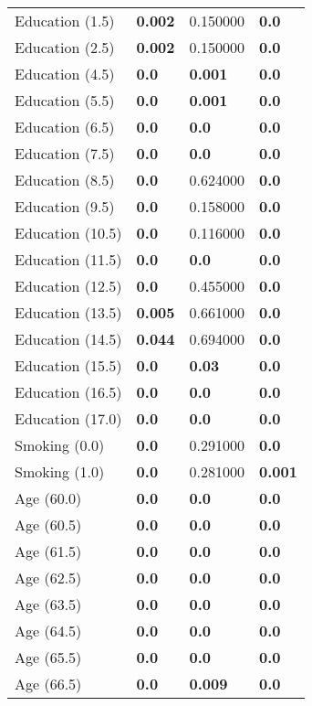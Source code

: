 \begin{tabular}{llll}
Education (1.5) & \textbf{0.002} & 0.150000 & \textbf{0.0} \\
Education (2.5) & \textbf{0.002} & 0.150000 & \textbf{0.0} \\
Education (4.5) & \textbf{0.0} & \textbf{0.001} & \textbf{0.0} \\
Education (5.5) & \textbf{0.0} & \textbf{0.001} & \textbf{0.0} \\
Education (6.5) & \textbf{0.0} & \textbf{0.0} & \textbf{0.0} \\
Education (7.5) & \textbf{0.0} & \textbf{0.0} & \textbf{0.0} \\
Education (8.5) & \textbf{0.0} & 0.624000 & \textbf{0.0} \\
Education (9.5) & \textbf{0.0} & 0.158000 & \textbf{0.0} \\
Education (10.5) & \textbf{0.0} & 0.116000 & \textbf{0.0} \\
Education (11.5) & \textbf{0.0} & \textbf{0.0} & \textbf{0.0} \\
Education (12.5) & \textbf{0.0} & 0.455000 & \textbf{0.0} \\
Education (13.5) & \textbf{0.005} & 0.661000 & \textbf{0.0} \\
Education (14.5) & \textbf{0.044} & 0.694000 & \textbf{0.0} \\
Education (15.5) & \textbf{0.0} & \textbf{0.03} & \textbf{0.0} \\
Education (16.5) & \textbf{0.0} & \textbf{0.0} & \textbf{0.0} \\
Education (17.0) & \textbf{0.0} & \textbf{0.0} & \textbf{0.0} \\
Smoking (0.0) & \textbf{0.0} & 0.291000 & \textbf{0.0} \\
Smoking (1.0) & \textbf{0.0} & 0.281000 & \textbf{0.001} \\
Age (60.0) & \textbf{0.0} & \textbf{0.0} & \textbf{0.0} \\
Age (60.5) & \textbf{0.0} & \textbf{0.0} & \textbf{0.0} \\
Age (61.5) & \textbf{0.0} & \textbf{0.0} & \textbf{0.0} \\
Age (62.5) & \textbf{0.0} & \textbf{0.0} & \textbf{0.0} \\
Age (63.5) & \textbf{0.0} & \textbf{0.0} & \textbf{0.0} \\
Age (64.5) & \textbf{0.0} & \textbf{0.0} & \textbf{0.0} \\
Age (65.5) & \textbf{0.0} & \textbf{0.0} & \textbf{0.0} \\
Age (66.5) & \textbf{0.0} & \textbf{0.009} & \textbf{0.0} \\

\end{tabular}

